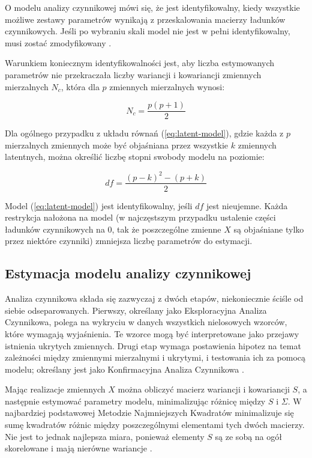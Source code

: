 \documentclass[12pt]{article}
\begin{document}
O modelu analizy czynnikowej mówi się, że jest identyfikowalny, kiedy wszystkie możliwe zestawy parametrów wynikają z przeskalowania macierzy ładunków czynnikowych. Jeśli po wybraniu skali model nie jest w pełni identyfikowalny, musi zostać zmodyfikowany \citep{ESSEduNet}.

Warunkiem koniecznym identyfikowalności jest, aby liczba estymowanych parametrów nie przekraczała liczby wariancji i kowariancji zmiennych mierzalnych \(N_c\), która dla \(p\) zmiennych mierzalnych wynosi:

\begin{equation}
\label{eq:ident-condition}
N_c = \frac{p(p+1)}{2}
\end{equation}

Dla ogólnego przypadku z układu równań (\ref{eq:latent-model}), gdzie każda z \(p\) mierzalnych zmiennych może być objaśniana przez wszystkie \(k\) zmiennych latentnych, można określić liczbę stopni swobody modelu na poziomie:

\begin{equation}
\label{eq:df}
df = \frac{(p-k)^2 - (p+k)}{2}
\end{equation}

Model (\ref{eq:latent-model}) jest identyfikowalny, jeśli \(df\) jest nieujemne. Każda restrykcja nałożona na model (w najczęstszym przypadku ustalenie części ładunków czynnikowych na 0, tak że poszczególne zmienne \(X\) są objaśniane tylko przez niektóre czynniki) zmniejsza liczbę parametrów do estymacji.

\hypertarget{estymacja-modelu-analizy-czynnikowej}{%
\subsection{Estymacja modelu analizy czynnikowej}\label{estymacja-modelu-analizy-czynnikowej}}

Analiza czynnikowa składa się zazwyczaj z dwóch etapów, niekoniecznie ściśle od siebie odseparowanych. Pierwszy, określany jako Eksploracyjna Analiza Czynnikowa, polega na wykryciu w danych wszystkich nielosowych wzorców, które wymagają wyjaśnienia. Te wzorce mogą być interpretowane jako przejawy istnienia ukrytych zmiennych. Drugi etap wymaga postawienia hipotez na temat zależności między zmiennymi mierzalnymi i ukrytymi, i testowania ich za pomocą modelu; określany jest jako Konfirmacyjna Analiza Czynnikowa \citep{Everitt}.

Mając realizacje zmiennych \(X\) można obliczyć macierz wariancji i kowariancji \(S\), a następnie estymować parametry modelu, minimalizując różnicę między \(S\) i \(\Sigma\). W najbardziej podstawowej Metodzie Najmniejszych Kwadratów minimalizuje się sumę kwadratów różnic między poszczególnymi elementami tych dwóch macierzy. Nie jest to jednak najlepsza miara, ponieważ elementy \(S\) są ze sobą na ogół skorelowane i mają nierówne wariancje \citep{Everitt}.
\end{document}
